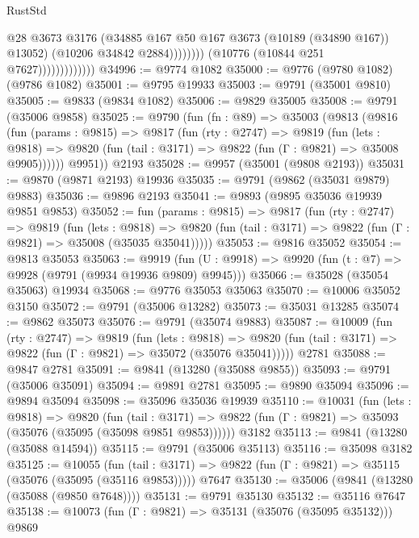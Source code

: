 \begin{lexlean}{RustStd}
\begin{coremodule}
                                        @28
                                        @3673
                                        @3176
                                        (@34885 @167 @50 @167 @3673 (@10189 (@34890 @167)) @13052)
                                        (@10206 @34842 @2884))))))))
                          (@10776 (@10844 @251 @7627)))))))))))))
@34996 := @9774 @1082
@35000 := @9776 (@9780 @1082) (@9786 @1082)
@35001 := @9795 @19933
@35003 := @9791 (@35001 @9810)
@35005 := @9833 (@9834 @1082)
@35006 := @9829 @35005
@35008 := @9791 (@35006 @9858)
@35025 := @9790
    (fun (fn : @89) =>
    @35003
      (@9813
        (@9816
          (fun (params : @9815) =>
          @9817
            (fun (rty : @2747) =>
            @9819
              (fun (lets : @9818) =>
              @9820 (fun (tail : @3171) => @9822 (fun (Γ : @9821) => @35008 @9905))))))
        @9951))
    @2193
@35028 := @9957 (@35001 (@9808 @2193))
@35031 := @9870 (@9871 @2193) @19936
@35035 := @9791 (@9862 (@35031 @9879) @9883)
@35036 := @9896 @2193
@35041 := @9893 (@9895 @35036 @19939 @9851 @9853)
@35052 := fun (params : @9815) =>
  @9817
    (fun (rty : @2747) =>
    @9819
      (fun (lets : @9818) =>
      @9820 (fun (tail : @3171) => @9822 (fun (Γ : @9821) => @35008 (@35035 @35041)))))
@35053 := @9816 @35052
@35054 := @9813 @35053
@35063 := @9919
    (fun (U : @9918) => @9920 (fun (t : @7) => @9928 (@9791 (@9934 @19936 @9809) @9945)))
@35066 := @35028 (@35054 @35063) @19934
@35068 := @9776 @35053 @35063
@35070 := @10006 @35052 @3150
@35072 := @9791 (@35006 @13282)
@35073 := @35031 @13285
@35074 := @9862 @35073
@35076 := @9791 (@35074 @9883)
@35087 := @10009
    (fun (rty : @2747) =>
    @9819
      (fun (lets : @9818) =>
      @9820 (fun (tail : @3171) => @9822 (fun (Γ : @9821) => @35072 (@35076 @35041)))))
    @2781
@35088 := @9847 @2781
@35091 := @9841 (@13280 (@35088 @9855))
@35093 := @9791 (@35006 @35091)
@35094 := @9891 @2781
@35095 := @9890 @35094
@35096 := @9894 @35094
@35098 := @35096 @35036 @19939
@35110 := @10031
    (fun (lets : @9818) =>
    @9820
      (fun (tail : @3171) =>
      @9822 (fun (Γ : @9821) => @35093 (@35076 (@35095 (@35098 @9851 @9853))))))
    @3182
@35113 := @9841 (@13280 (@35088 @14594))
@35115 := @9791 (@35006 @35113)
@35116 := @35098 @3182
@35125 := @10055
    (fun (tail : @3171) => @9822 (fun (Γ : @9821) => @35115 (@35076 (@35095 (@35116 @9853)))))
    @7647
@35130 := @35006 (@9841 (@13280 (@35088 (@9850 @7648))))
@35131 := @9791 @35130
@35132 := @35116 @7647
@35138 := @10073 (fun (Γ : @9821) => @35131 (@35076 (@35095 @35132))) @9869

\end{coremodule}
\end{lexlean}
